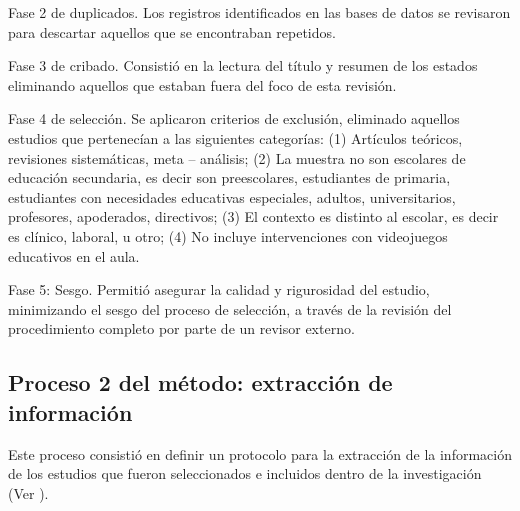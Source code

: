 \documentclass[spanish]{textolivre}
\begin{document}
Fase 2 de duplicados. Los registros identificados en las bases de datos se revisaron para descartar aquellos que se encontraban repetidos. 

Fase 3 de cribado. Consistió en la lectura del título y resumen de los estados eliminando aquellos que estaban fuera del foco de esta revisión. 

Fase 4 de selección. Se aplicaron criterios de exclusión, eliminado aquellos estudios que pertenecían a las siguientes categorías: (1) Artículos teóricos, revisiones sistemáticas, meta – análisis; (2) La muestra no son escolares de educación secundaria, es decir son preescolares, estudiantes de primaria, estudiantes con necesidades educativas especiales, adultos, universitarios, profesores, apoderados, directivos; (3) El contexto es distinto al escolar, es decir es clínico, laboral, u otro; (4) No incluye intervenciones con videojuegos educativos en el aula. 

Fase 5: Sesgo. Permitió asegurar la calidad y rigurosidad del estudio, minimizando el sesgo del proceso de selección, a través de la revisión del procedimiento completo por parte de un revisor externo. 

\subsection{Proceso 2 del método: extracción de información}\label{sec-fmt-manuscrito}
Este proceso consistió en definir un protocolo para la extracción de la información de los estudios que fueron seleccionados e incluidos dentro de la investigación (Ver ).
\end{document}
